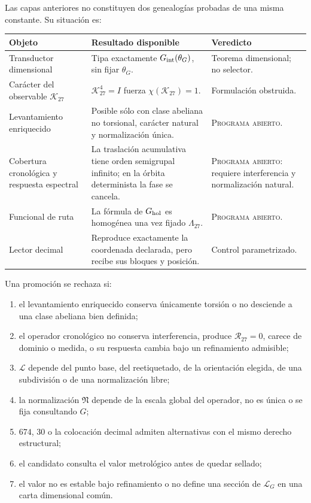 Las capas anteriores no constituyen dos genealogías probadas de una misma
constante. Su situación es:
\begin{center}
\begin{tabularx}{0.96\textwidth}{@{}L{0.25\textwidth}Y L{0.26\textwidth}@{}}
\toprule
Objeto & Resultado disponible & Veredicto\\
\midrule
Transductor dimensional &
Tipa exactamente \(G_{\rm int}(\theta_G)\), sin fijar \(\theta_G\). &
Teorema dimensional; no selector.\\
Carácter del observable \(\mathcal K_{27}\) &
\(\mathcal K_{27}^4=I\) fuerza
\(\chi(\mathcal K_{27})=1\). &
Formulación obstruida.\\
Levantamiento enriquecido &
Posible sólo con clase abeliana no torsional, carácter natural y
normalización única. &
\textsc{Programa abierto}.\\
Cobertura cronológica y respuesta espectral &
La traslación acumulativa tiene orden semigrupal infinito; en la órbita
determinista la fase se cancela. &
\textsc{Programa abierto}: requiere interferencia y normalización natural.\\
Funcional de ruta &
La fórmula de \(G_{\rm hol}\) es homogénea una vez fijado
\(\Lambda_{27}\). &
\textsc{Programa abierto}.\\
Lector decimal &
Reproduce exactamente la coordenada declarada, pero recibe sus bloques y
posición. &
Control parametrizado.\\
\bottomrule
\end{tabularx}
\end{center}

\begin{criterion}
\label{crit:selector-G}
Una promoción se rechaza si:
\begin{enumerate}
 \item el levantamiento enriquecido conserva únicamente torsión o no desciende
 a una clase abeliana bien definida;
 \item el operador cronológico no conserva interferencia, produce
 \(\mathcal R_{27}=0\), carece de dominio o medida, o su respuesta cambia bajo
 un refinamiento admisible;
 \item \(\mathscr L\) depende del punto base, del reetiquetado, de la
 orientación elegida, de una subdivisión o de una normalización libre;
 \item la normalización \(\mathfrak N\) depende de la escala global del
 operador, no es única o se fija consultando \(G\);
 \item \(674\), \(30\) o la colocación decimal admiten alternativas con el
 mismo derecho estructural;
 \item el candidato consulta el valor metrológico antes de quedar sellado;
 \item el valor no es estable bajo refinamiento o no define una sección de
 \(\mathcal L_G\) en una carta dimensional común.
\end{enumerate}
\end{criterion}

